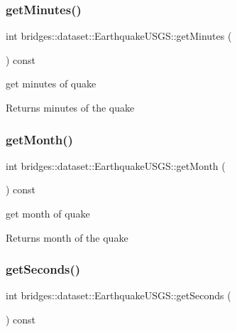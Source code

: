 \subsubsection{\texorpdfstring{get\+Minutes()}{getMinutes()}}
{\footnotesize\ttfamily int bridges\+::dataset\+::\+Earthquake\+U\+S\+G\+S\+::get\+Minutes (\begin{DoxyParamCaption}{ }\end{DoxyParamCaption}) const\hspace{0.3cm}{\ttfamily [inline]}}



get minutes of quake 

\begin{DoxyReturn}{Returns}
minutes of the quake 
\end{DoxyReturn}
\mbox{\label{classbridges_1_1dataset_1_1_earthquake_u_s_g_s_a010247e7474cc2434fff823a1a8b1142}} 
\subsubsection{\texorpdfstring{get\+Month()}{getMonth()}}
{\footnotesize\ttfamily int bridges\+::dataset\+::\+Earthquake\+U\+S\+G\+S\+::get\+Month (\begin{DoxyParamCaption}{ }\end{DoxyParamCaption}) const\hspace{0.3cm}{\ttfamily [inline]}}



get month of quake 

\begin{DoxyReturn}{Returns}
month of the quake 
\end{DoxyReturn}
\mbox{\label{classbridges_1_1dataset_1_1_earthquake_u_s_g_s_af91ae1415cc7e0b82a5d288b7e033cd0}} 
\subsubsection{\texorpdfstring{get\+Seconds()}{getSeconds()}}
{\footnotesize\ttfamily int bridges\+::dataset\+::\+Earthquake\+U\+S\+G\+S\+::get\+Seconds (\begin{DoxyParamCaption}{ }\end{DoxyParamCaption}) const\hspace{0.3cm}{\ttfamily [inline]}}



